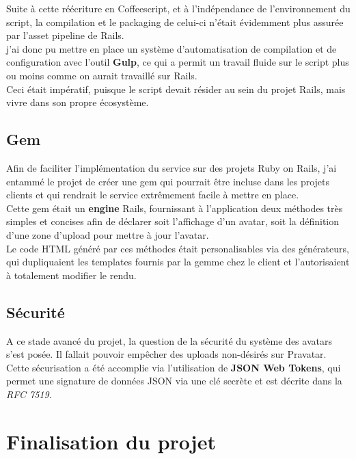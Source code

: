 \documentclass{report}
\begin{document}
      Suite à cette réécriture en Coffeescript, et à l'indépendance de l'environnement du script, la compilation et le packaging de celui-ci n'était évidemment plus assurée par l'asset pipeline de Rails.\\
      j'ai donc pu mettre en place un système d'automatisation de compilation et de configuration avec l'outil \textbf{Gulp}, ce qui a permit un travail fluide sur le script
      plus ou moins comme on aurait travaillé sur Rails.\\
      Ceci était impératif, puisque le script devait résider au sein du projet Rails, mais vivre dans son propre écosystème.\\

    \subsection{Gem}
    \label{sub:Gem}

      Afin de faciliter l'implémentation du service sur des projets Ruby on Rails, j'ai entammé le projet de créer une gem qui pourrait être incluse dans les projets clients et qui rendrait le service
      extrêmement facile à mettre en place.\\

      Cette gem était un \textbf{engine} Rails, fournissant à l'application deux méthodes très simples et concises afin de déclarer soit l'affichage d'un avatar, soit la définition d'une zone d'upload pour
      mettre à jour l'avatar.\\
      Le code HTML généré par ces méthodes était personalisables via des générateurs, qui dupliquaient les templates fournis par la gemme chez le client et l'autorisaient à totalement modifier le rendu.\\

    \subsection{Sécurité}
    \label{sub:Sécurité}

      A ce stade avancé du projet, la question de la sécurité du système des avatars s'est posée. Il fallait pouvoir empêcher des uploads non-désirés sur Pravatar.\\
      Cette sécurisation a été accomplie via l'utilisation de \textbf{JSON Web Tokens}, qui permet une signature de données JSON via une clé secrète et est décrite dans la \textit{RFC 7519}.

  \section{Finalisation du projet}
  \label{sec:Finalisation du projet}
\end{document}
